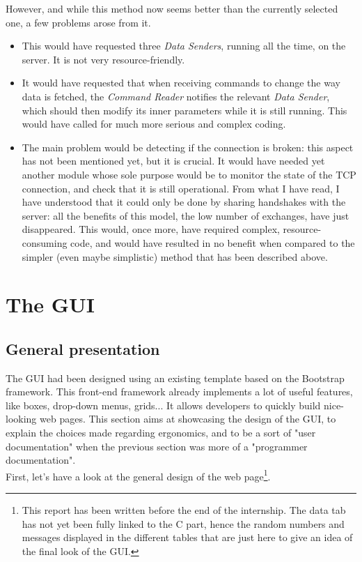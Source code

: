 \documentclass{themeensg}
\begin{document}
However, and while this method now seems better than the currently selected one, a few problems arose from it.\begin{itemize}
\item This would have requested three \textit{Data Senders}, running all the time, on the server. It is not very resource-friendly.
\item It would have requested that when receiving commands to change the way data is fetched, the \textit{Command Reader} notifies the relevant \textit{Data Sender}, which should then modify its inner parameters while it is still running. This would have called for much more serious and complex coding.
\item The main problem would be detecting if the connection is broken: this aspect has not been mentioned yet, but it is crucial. It would have needed yet another module whose sole purpose would be to monitor the state of the TCP connection, and check that it is still operational. From what I have read, I have understood that it could only be done by sharing handshakes with the server: all the benefits of this model, the low number of exchanges, have just disappeared. This would, once more, have required complex, resource-consuming code, and would have resulted in no benefit when compared to the simpler (even maybe simplistic) method that has been described above.
\end{itemize}

\clearpage
\section{The GUI}

\subsection{General presentation}
The GUI had been designed using an existing template based on the Bootstrap framework. This front-end framework already implements a lot of useful features, like boxes, drop-down menus, grids... It allows developers to quickly build nice-looking web pages. This section aims at showcasing the design of the GUI, to explain the choices made regarding ergonomics, and to be a sort of "user documentation" when the previous section was more of a "programmer documentation".\\

First, let's have a look at the general design of the web page\footnote{This report has been written before the end of the internship. The data tab has not yet been fully linked to the C part, hence the random numbers and messages displayed in the different tables that are just here to give an idea of the final look of the GUI.}.\\
\end{document}
